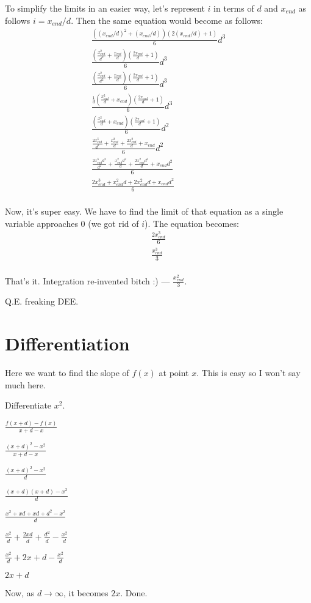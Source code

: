 \documentclass{report}
\begin{document}
To simplify the limits in an easier way, let's represent $i$ in terms of $d$
and $x_{end}$ as follows $i = x_{end}/d$. Then the same equation would become
as follows:
\[\begin{split}
  \frac{((x_{end}/d)^2+(x_{end}/d))(2(x_{end}/d)+1)}{6}d^3\\
  \frac{(\frac{x_{end}^2}{d^2}+\frac{x_{end}}{d})(\frac{2x_{end}}{d}+1)}{6}d^3\\
  \frac{(\frac{x_{end}^2}{d^2}+\frac{x_{end}}{d})(\frac{2x_{end}}{d}+1)}{6}d^3\\
  \frac{\frac{1}{d}(\frac{x_{end}^2}{d}+x_{end})(\frac{2x_{end}}{d}+1)}{6}d^3\\
  \frac{(\frac{x_{end}^2}{d}+x_{end})(\frac{2x_{end}}{d}+1)}{6}d^2\\
  \frac{\frac{2x_{end}^3}{d^2} +  \frac{x_{end}^2}{d} +  \frac{2x_{end}^2}{d} + x_{end}}{6}d^2\\
  \frac{\frac{2x_{end}^3d^2}{d^2} +  \frac{x_{end}^2d^2}{d} +  \frac{2x_{end}^2d^2}{d} + x_{end}d^2}{6}\\
  \frac{2x_{end}^3 +  x_{end}^2d +  2x_{end}^2d + x_{end}d^2}{6}\\
\end{split}\]

Now, it's super easy. We have to find the limit of that equation as a single
variable approaches 0 (we got rid of $i$). The equation becomes:
\[\begin{split}
  \frac{2x_{end}^3}{6}\\
  \frac{x_{end}^3}{3}\\
\end{split}\]

That's it. Integration re-invented bitch :) --- $\frac{x_{end}^2}3$.

Q.E. freaking DEE.


\chapter{Differentiation}
Here we want to find the slope of $f(x)$ at point $x$. This is easy so I won't
say much here.

Differentiate $x^2$.

$\frac{f(x+d) - f(x)}{x + d - x}$

$\frac{(x+d)^2 - x^2}{x + d - x}$

$\frac{(x+d)^2 - x^2}{d}$

$\frac{(x+d)(x+d) - x^2}{d}$

$\frac{x^2 + xd + xd + d^2 - x^2}{d}$

$\frac{x^2}{d} + \frac{2xd}{d} + \frac{d^2}{d} - \frac{x^2}{d}$

$\frac{x^2}{d} + 2x + d - \frac{x^2}{d}$

$2x + d$

Now, as $d \rightarrow \infty$, it becomes $2x$. Done.
\end{document}
